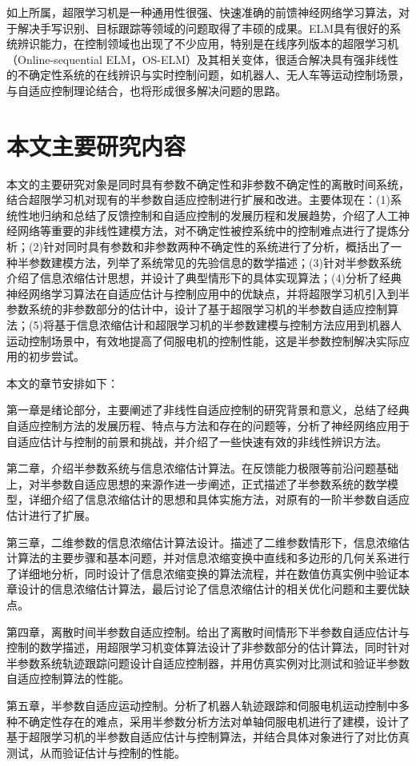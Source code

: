 如上所属，超限学习机是一种通用性很强、快速准确的前馈神经网络学习算法，对于解决手写识别、目标跟踪等领域的问题取得了丰硕的成果。ELM具有很好的系统辨识能力，在控制领域也出现了不少应用，特别是在线序列版本的超限学习机（Online-sequential ELM，OS-ELM）及其相关变体，很适合解决具有强非线性的不确定性系统的在线辨识与实时控制问题，如机器人、无人车等运动控制场景，与自适应控制理论结合，也将形成很多解决问题的思路。

\section{本文主要研究内容}\label{sect:1.3}

本文的主要研究对象是同时具有参数不确定性和非参数不确定性的离散时间系统，结合超限学习机对现有的半参数自适应控制进行扩展和改进。主要体现在：(1)系统性地归纳和总结了反馈控制和自适应控制的发展历程和发展趋势，介绍了人工神经网络等重要的非线性建模方法，对不确定性被控系统中的控制难点进行了提炼分析；(2)针对同时具有参数和非参数两种不确定性的系统进行了分析，概括出了一种半参数建模方法，列举了系统常见的先验信息的数学描述；(3)针对半参数系统介绍了信息浓缩估计思想，并设计了典型情形下的具体实现算法；(4)分析了经典神经网络学习算法在自适应估计与控制应用中的优缺点，并将超限学习机引入到半参数系统的非参数部分的估计中，设计了基于超限学习机的半参数自适应控制算法；(5)将基于信息浓缩估计和超限学习机的半参数建模与控制方法应用到机器人运动控制场景中，有效地提高了伺服电机的控制性能，这是半参数控制解决实际应用的初步尝试。

本文的章节安排如下：

第一章是绪论部分，主要阐述了非线性自适应控制的研究背景和意义，总结了经典自适应控制方法的发展历程、特点与方法和存在的问题等，分析了神经网络应用于自适应估计与控制的前景和挑战，并介绍了一些快速有效的非线性辨识方法。

第二章，介绍半参数系统与信息浓缩估计算法。在反馈能力极限等前沿问题基础上，对半参数自适应思想的来源作进一步阐述，正式描述了半参数系统的数学模型，详细介绍了信息浓缩估计的思想和具体实施方法，对原有的一阶半参数自适应估计进行了扩展。

第三章，二维参数的信息浓缩估计算法设计。描述了二维参数情形下，信息浓缩估计算法的主要步骤和基本问题，并对信息浓缩变换中直线和多边形的几何关系进行了详细地分析，同时设计了信息浓缩变换的算法流程，并在数值仿真实例中验证本章设计的信息浓缩估计算法，最后讨论了信息浓缩估计的相关优化问题和主要优缺点。

第四章，离散时间半参数自适应控制。给出了离散时间情形下半参数自适应估计与控制的数学描述，用超限学习机变体算法设计了非参数部分的估计算法，同时针对半参数系统轨迹跟踪问题设计自适应控制器，并用仿真实例对比测试和验证半参数自适应控制算法的性能。

第五章，半参数自适应运动控制。分析了机器人轨迹跟踪和伺服电机运动控制中多种不确定性存在的难点，采用半参数分析方法对单轴伺服电机进行了建模，设计了基于超限学习机的半参数自适应估计与控制算法，并结合具体对象进行了对比仿真测试，从而验证估计与控制的性能。
